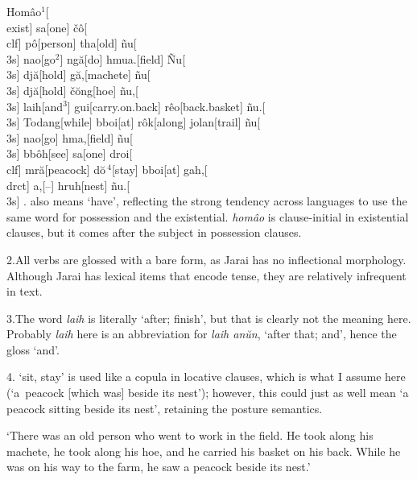 \ex[glstyle=nlevel]
\beginglpanel
Hom\^{a}o$^1$[\\{exist}]  sa[one]  \v{c}\^{o}[\\{clf}]
p\^{o}[person]  tha[old]  \~{n}u[\\{3s}]  nao[go$^2$]
ng\u{a}[do]  hmua.[field]  \~{N}u[\\{3s}]  dj\u{a}[hold]
g\u{a},[machete]  \~{n}u[\\{3s}]  dj\u{a}[hold]
\v{c}\u{o}ng[hoe]  \~{n}u,[\\{3s}]  laih[and$^3$]
gui[carry.on.back]  r\^{e}o[back.basket]  \~{n}u.[\\{3s}]
Todang[while]  bboi[at]  r\^{o}k[along]  jolan[trail]
\~{n}u[\\{3s}]  nao[go]  hma,[field]  \~{n}u[\\{3s}]
bb\^{o}h[see]  sa[one]  droi[\\{clf}]  mr\u{a}[peacock]
d\u{o}$\,^4$[stay]  bboi[at]  gah,[\\{drct}]  a,[--]
hruh[nest]  \~{n}u.[\\{3s}]
. also means `have', reflecting the
strong tendency across languages to use the same word for
possession and the existential. {\it hom\^{a}o} is clause-initial
in existential clauses, but it comes after the subject in
possession clauses.

2.\enspace All verbs are glossed with a bare form, as Jarai has
no inflectional morphology. Although Jarai has lexical items that
encode tense, they are relatively infrequent in text.

3.\enspace The word {\it laih} is literally `after; finish', but
that is clearly not the meaning here. Probably {\it laih} here is
an abbreviation for {\it laih an\u{u}n}, `after that; and', hence
the gloss `and'.

4. `sit, stay' is used like a copula in
locative clauses, which is what I assume here (`a~peacock
[which was] beside its nest'); however, this could just as well
mean `a peacock sitting beside its nest', retaining the posture
semantics.
\endpanel

\bigskip
`There was an old person who went to work in the field. He took
along his machete, he took along his hoe, and he carried his
basket on his back. While he was on his way to the farm, he saw a
peacock beside its nest.'
\xe
\endinput


\endinput


